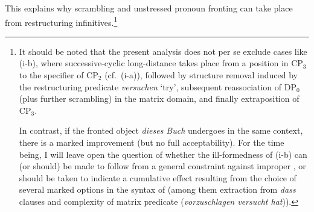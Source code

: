 \documentclass[output=paper]{langsci/langscibook}
\begin{document}
This explains why scrambling and unstressed pronoun fronting can take place
from restructuring infinitives.\footnote{It should be noted that the present
    analysis does not per se exclude cases like (i-b), where successive-cyclic
    long-distance  takes place from a position in CP$_3$ to the
    specifier of CP$_2$ (cf.\ (i-a)), followed by structure removal induced by
    the restructuring predicate {\itshape versuchen} \enquote*{try}, subsequent
    reassociation of DP$_0$ (plus further scrambling) in the matrix domain, and
    finally extraposition of CP$_3$.

\begin{exe}
\begin{xlist}
\end{xlist}
\end{exe}

In contrast, if the fronted object {\itshape dieses Buch} undergoes
in the same context, there is a marked improvement (but no full
acceptability). For the time being, I will leave open the question of whether
the ill-formedness of (i-b) can (or should) be made to follow from a general
constraint against improper , or should be taken to indicate a
cumulative effect resulting from the choice of several marked options in the
syntax of  (among them extraction from {\itshape dass} clauses and complexity
of matrix predicate ({\itshape vorzuschlagen versucht hat})).}
\end{document}
